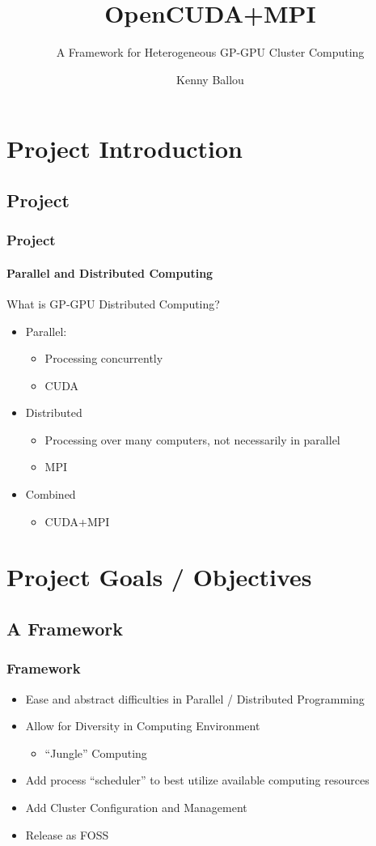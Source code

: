 \documentclass{beamer}
\title{OpenCUDA+MPI}
\subtitle{A Framework for Heterogeneous GP-GPU Cluster Computing}
\author[Ballou]{Kenny Ballou}
\begin{document}
\begin{frame}[label=titleslide]
\titlepage
\end{frame}
\begin{frame}
\tableofcontents[subsectionstyle=hide]
\end{frame}
\section{Project Introduction}
\subsection{Project}
\begin{frame}
\frametitle{Project}
\framesubtitle{Parallel and Distributed Computing}
What is GP-GPU Distributed Computing?
\begin{itemize}
\item{Parallel:}
\begin{itemize}
\item{Processing concurrently}
\item{CUDA}
\end{itemize}
\item{Distributed}
\begin{itemize}
\item{Processing over many computers, not necessarily in parallel}
\item{MPI}
\end{itemize}
\item{Combined}
\begin{itemize}
\item{CUDA+MPI}
\end{itemize}
\end{itemize}
\end{frame}
\section{Project Goals / Objectives}
\subsection{A Framework}
\begin{frame}
\frametitle{Framework}
\begin{itemize}
\item{Ease and abstract difficulties in Parallel / Distributed Programming}
\item{Allow for Diversity in Computing Environment}
\begin{itemize}
\item{``Jungle'' Computing}
\end{itemize}
\item{Add process ``scheduler'' to best utilize available computing resources}
\item{Add Cluster Configuration and Management}
\item{Release as FOSS}
\end{itemize}
\end{frame}
\end{document}
